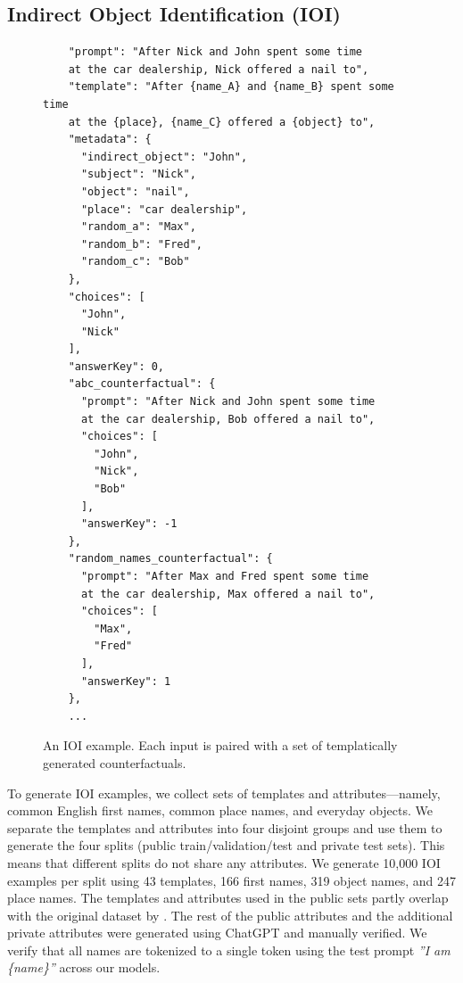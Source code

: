 \documentclass{article}
\theoremstyle{plain}
\theoremstyle{definition}
\theoremstyle{remark}
\newcommand{\sarah}[2][]{\todo[color=blue!20, #1]{\textbf{Sarah:} #2}}
\begin{document}
\subsection{Indirect Object Identification (IOI)}
\label{app:ioi_data}

\begin{figure}
\begin{lstlisting}
    "prompt": "After Nick and John spent some time 
    at the car dealership, Nick offered a nail to",
    "template": "After {name_A} and {name_B} spent some time
    at the {place}, {name_C} offered a {object} to",
    "metadata": {
      "indirect_object": "John",
      "subject": "Nick",
      "object": "nail",
      "place": "car dealership",
      "random_a": "Max",
      "random_b": "Fred",
      "random_c": "Bob"
    },
    "choices": [
      "John",
      "Nick"
    ],
    "answerKey": 0,
    "abc_counterfactual": {
      "prompt": "After Nick and John spent some time
      at the car dealership, Bob offered a nail to",
      "choices": [
        "John",
        "Nick",
        "Bob"
      ],
      "answerKey": -1
    },
    "random_names_counterfactual": {
      "prompt": "After Max and Fred spent some time
      at the car dealership, Max offered a nail to",
      "choices": [
        "Max",
        "Fred"
      ],
      "answerKey": 1
    },
    ...
\end{lstlisting}
\caption{An IOI example. Each input is paired with a set of templatically generated counterfactuals.} 
\label{fig:ioi_format}
\end{figure}

To generate IOI examples, we collect sets of templates and attributes---namely, common English first names, common place names, and everyday objects. 
We separate the templates and attributes into four disjoint groups and use them to generate the four splits (public train/validation/test and private test sets). This means that different splits do not share any attributes. We generate 10,000 IOI examples per split using 43 templates, 166 first names, 319 object names, and 247 place names. 
The templates and attributes used in the public sets partly overlap with the original dataset by \citet{wang2022interpretability}. The rest of the public attributes and the additional private attributes were generated using ChatGPT \cite{openai2022chatgpt} and manually verified. We verify that all names are tokenized to a single token using the test prompt \textit{''I am \{name\}''} across our models.
\end{document}
